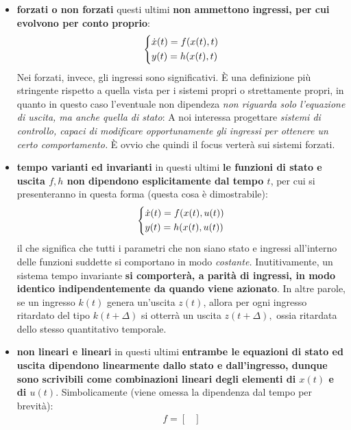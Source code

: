 \documentclass[a4paper]{report}
\begin{document}
\begin{itemize}
	\item \textbf{forzati o non forzati} \rarr questi ultimi \textbf{non ammettono ingressi, per cui evolvono per conto proprio}:
		\begin{equation*}
		\begin{dcases}
			\dot x(t)=f(x(t), t) \\
			y(t)=h(x(t),t)
		\end{dcases}
\end{equation*} 
	 Nei forzati, invece, gli ingressi sono significativi. È una definizione più stringente rispetto a quella vista per i sistemi propri o strettamente propri, in quanto in questo caso l'eventuale non dipendeza \textit{non riguarda solo l'equazione di uscita, ma anche quella di stato}:
A noi interessa progettare \textit{sistemi di controllo, capaci di modificare opportunamente gli ingressi per ottenere un certo comportamento.} È ovvio che quindi il focus verterà sui sistemi forzati.
\item\textbf{tempo varianti ed invarianti} \rarr in questi ultimi \textbf{le funzioni di stato e uscita $f, h$ non dipendono esplicitamente dal tempo $t$}, per cui si presenteranno in questa forma (questa cosa è dimostrabile):
\begin{equation*}
\begin{dcases}
		\dot x(t) = f(x(t), u(t)) \\
		y(t) =  h(x(t), u(t))
\end{dcases}
\end{equation*}
il che significa che tutti i parametri che non siano stato e ingressi all'interno delle funzioni suddette si comportano in modo \textit{costante.}
Inutitivamente, un sistema tempo invariante \textbf{si comporterà, a parità di ingressi, in modo identico indipendentemente da quando viene azionato}. In altre parole, se un ingresso $k(t)$ genera un'uscita $z(t)$, allora per ogni ingresso ritardato del tipo $k(t+\Delta)$ si otterrà un uscita $z(t+\Delta),$ ossia ritardata dello stesso quantitativo temporale.
\item \textbf{non lineari e lineari} \rarr in questi ultimi \textbf{entrambe le equazioni di stato ed uscita dipendono linearmente dallo stato e dall'ingresso, dunque sono scrivibili come combinazioni lineari degli elementi di $x(t)$ e di $u(t)$}. Simbolicamente (viene omessa la dipendenza dal tempo per brevità):
\begin{align}
	\label{f_lineare}
	f = \begin{bmatrix}

\end{bmatrix}
\end{align}
\end{itemize}
\end{document}
